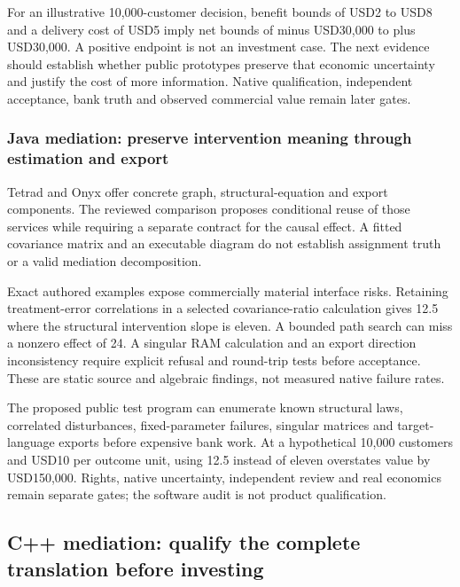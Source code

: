 For an illustrative 10,000-customer decision, benefit bounds of USD2 to
USD8 and a delivery cost of USD5 imply net bounds of minus USD30,000 to
plus USD30,000. A positive endpoint is not an investment case. The next
evidence should establish whether public prototypes preserve that
economic uncertainty and justify the cost of more information. Native
qualification, independent acceptance, bank truth and observed
commercial value remain later gates. \citep{exec25_pymed_choice}

\hypertarget{java-mediation-preserve-intervention-meaning-through-estimation-and-export}{%
\subsubsection{Java mediation: preserve intervention meaning through
estimation and
export}\label{java-mediation-preserve-intervention-meaning-through-estimation-and-export}}

Tetrad and Onyx offer concrete graph, structural-equation and export
components. The reviewed comparison proposes conditional reuse of those
services while requiring a separate contract for the causal effect. A
fitted covariance matrix and an executable diagram do not establish
assignment truth or a valid mediation decomposition.
\citep{exec25_jmed_tetrad,exec25_jmed_onyx}

Exact authored examples expose commercially material interface risks.
Retaining treatment-error correlations in a selected covariance-ratio
calculation gives 12.5 where the structural intervention slope is
eleven. A bounded path search can miss a nonzero effect of 24. A
singular RAM calculation and an export direction inconsistency require
explicit refusal and round-trip tests before acceptance. These are
static source and algebraic findings, not measured native failure rates.
\citep{exec25_jmed_choice}

The proposed public test program can enumerate known structural laws,
correlated disturbances, fixed-parameter failures, singular matrices and
target-language exports before expensive bank work. At a hypothetical
10,000 customers and USD10 per outcome unit, using 12.5 instead of
eleven overstates value by USD150,000. Rights, native uncertainty,
independent review and real economics remain separate gates; the
software audit is not product qualification. \citep{exec25_jmed_choice}

\hypertarget{c-mediation-qualify-the-complete-translation-before-investing}{%
\subsection{C++ mediation: qualify the complete translation before
investing}\label{c-mediation-qualify-the-complete-translation-before-investing}}

